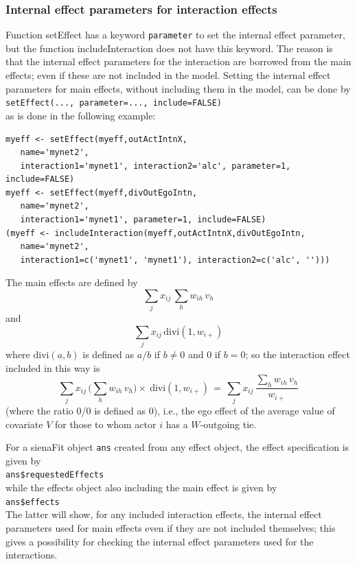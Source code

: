 \documentclass[a4paper,fleqn,11pt]{article}
\newcommand{\+}{\, + \,}
\newcommand{\sfn}[1]{\textsf{#1}}
\begin{document}
\subsubsection{Internal effect parameters for interaction effects}
\label{intint}

Function \sfn{setEffect} has a keyword \texttt{parameter} to set the
internal effect parameter, but the function  \sfn{includeInteraction} does not
have this keyword. The reason is that the internal effect parameters for the
interaction are borrowed from the main effects; even if these are
not included in the model.
Setting the internal effect parameters for main effects, without including them
in the model, can be done by \\[0.2em]
\texttt{setEffect(..., parameter=..., include=FALSE)}\\[0.2em]
 as is done in the following example:
\begin{verbatim}
myeff <- setEffect(myeff,outActIntnX,
   name='mynet2',
   interaction1='mynet1', interaction2='alc', parameter=1, include=FALSE)
myeff <- setEffect(myeff,divOutEgoIntn,
   name='mynet2',
   interaction1='mynet1', parameter=1, include=FALSE)
(myeff <- includeInteraction(myeff,outActIntnX,divOutEgoIntn,
   name='mynet2',
   interaction1=c('mynet1', 'mynet1'), interaction2=c('alc', '')))
\end{verbatim}
The main effects are defined by
\[
\sum_j x_{ij}\, \sum_h w_{ih}\,v_h
\] and
\[
  \sum_j x_{ij}\, \text{divi}(1, w_{i+})
\]
where $\text{divi}(a,b)$ is defined as $a/b$ if $b \neq 0$ and 0 if $b=0$;
so the interaction effect included in this way is
\[
\sum_j x_{ij}\,  \Big( \sum_h w_{ih}\,v_h \Big) \times\ \text{divi}(1, w_{i+})
 \,=\,   \sum_j x_{ij}\, \frac{\sum_h w_{ih}\,v_h}{ w_{i+}}
\]
(where the ratio 0/0 is defined as 0), i.e., the ego effect of the
average value of covariate $V$
for those to whom actor $i$ has a $W$-outgoing tie.
\medskip


For a \sfn{sienaFit} object \texttt{ans} created from any effect object,
the effect specification is given by\\[0.3em]
\texttt{ans\$requestedEffects}\\[0.3em]
while the effects object also including the main effect is given by\\[0.3em]
\texttt{ans\$effects}\\[0.3em]
The latter will show, for any included interaction effects,
the internal effect parameters used for main effects
even if they are not included themselves; this gives
a possibility for checking the internal effect parameters
used for the interactions.
\end{document}
